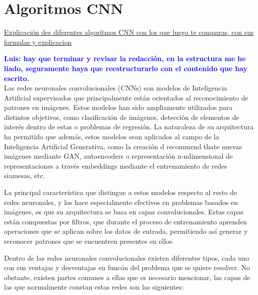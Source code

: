 \documentclass{uathesis-es}
\begin{document}
\section{Algoritmos CNN}

\underline{Explicación des diferentes algoritmos CNN con los que luego te comparas, con sus formulas y explicacion}

\textcolor{blue}{\textbf{Luis: hay que terminar y revisar la redacción, en la estructura me he liado, seguramente haya que reestructurarlo con el contenido que hay escrito.}}\\


Las redes neuronales convolucionales (CNNs) son modelos de Inteligencia Artificial supervisados que principalmente están orientados al reconocimiento de patrones en imágenes. Estos modelos han sido ampliamente utilizados para distintos objetivos, como clasificación de imágenes, detección de elementos de interés dentro de estas o problemas de regresión. La naturaleza de su arquitectura ha permitido que además, estos modelos sean aplicados al campo de la Inteligencia Artificial Generativa, como la creación d recommend thate nuevas imágenes mediante GAN, autoencoders o representación n-ndimensional de representaciones a través embeddings mediante el entrenamiento de redes siamesas, etc.

La principal característica que distingue a estos modelos respecto al resto de redes neuronales, y los hace especialmente efectivos en problemas basados en imágenes, es que su arquitectura se basa en capas convolucionales. Estas capas están compuestas por filtros, que durante el proceso de entrenamiento aprenden operaciones que se aplican sobre los datos de entrada, permitiendo así generar y reconocer patrones que se encuentren presentes en ellos.

Dentro de las redes neuronales convolucionales existen diferentes tipos, cada uno con sus ventajas y desventajas en funcón del problema que se quiere resolver. No obstante, existen partes comunes a ellas que es necesario mencionar, las capas de las que normalmente constan estas redes son las siguientes:
\end{document}
